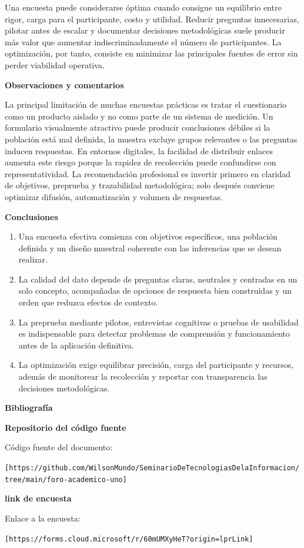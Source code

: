\documentclass[12pt,letterpaper]{article}
\newcommand{\seccion}[1]{%
  \vspace{4pt}%
  {\noindent\textbf{#1}\par}%
  \vspace{1pt}%
}
\begin{document}
Una encuesta puede considerarse óptima cuando consigue un equilibrio entre rigor, carga para el participante, costo y utilidad. Reducir preguntas innecesarias, pilotar antes de escalar y documentar decisiones metodológicas suele producir más valor que aumentar indiscriminadamente el número de participantes. La optimización, por tanto, consiste en minimizar las principales fuentes de error sin perder viabilidad operativa.

\seccion{Observaciones y comentarios}
La principal limitación de muchas encuestas prácticas es tratar el cuestionario como un producto aislado y no como parte de un sistema de medición. Un formulario visualmente atractivo puede producir conclusiones débiles si la población está mal definida, la muestra excluye grupos relevantes o las preguntas inducen respuestas. En entornos digitales, la facilidad de distribuir enlaces aumenta este riesgo porque la rapidez de recolección puede confundirse con representatividad. La recomendación profesional es invertir primero en claridad de objetivos, preprueba y trazabilidad metodológica; solo después conviene optimizar difusión, automatización y volumen de respuestas.

\seccion{Conclusiones}
\begin{enumerate}
  \item Una encuesta efectiva comienza con objetivos específicos, una población definida y un diseño muestral coherente con las inferencias que se desean realizar.
  \item La calidad del dato depende de preguntas claras, neutrales y centradas en un solo concepto, acompañadas de opciones de respuesta bien construidas y un orden que reduzca efectos de contexto.
  \item La preprueba mediante pilotos, entrevistas cognitivas o pruebas de usabilidad es indispensable para detectar problemas de comprensión y funcionamiento antes de la aplicación definitiva.
  \item La optimización exige equilibrar precisión, carga del participante y recursos, además de monitorear la recolección y reportar con transparencia las decisiones metodológicas.
\end{enumerate}

\seccion{Bibliografía}
\printbibliography[heading=none]

\seccion{Repositorio del código fuente}
Código fuente del documento:\par
\texttt{[https://github.com/WilsonMundo/SeminarioDeTecnologiasDelaInformacion/tree/main/foro-academico-uno]}

\seccion{link de encuesta}
Enlace a la encuesta:\par
\texttt{[https://forms.cloud.microsoft/r/60mUMXyHeT?origin=lprLink]}
\end{document}
